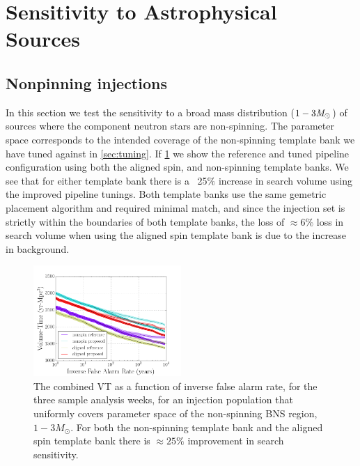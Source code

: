 
\section{Sensitivity to Astrophysical Sources}
\subsection{Nonpinning injections}

In this section we test the sensitivity to a broad mass distribution ($1-3 \mathit{M}_\odot$) of sources where the component neutron stars are non-spinning. The parameter space corresponds to the intended coverage of the non-spinning template bank we have tuned against in \ref{sec:tuning}.  If \ref{fig:nonspin} we show the reference and tuned pipeline configuration using both the aligned spin, and non-spinning template banks. We see that for either template bank there is a ~25$\%$ increase in search volume using the improved pipeline tunings. Both template banks use the same gemetric placement algorithm and required minimal match, and since the injection set is strictly within the boundaries of both template banks, the loss of $\approx 6\%$ loss in search volume when using the aligned spin template bank is due to the increase in background.

\begin{figure}
\includegraphics[width=0.5\textwidth]{papers/bns_o1_dev/figures/ns_combined.png}
\caption{\label{fig:nonspin} 
The combined VT as a function of inverse false alarm rate, for the
three sample analysis weeks, for an injection population that uniformly covers parameter space of the non-spinning BNS region, $1- 3M_\odot$. For both the non-spinning template bank and the aligned spin template bank there is $\approx 25 \%$ improvement in search sensitivity.
}
\end{figure}


